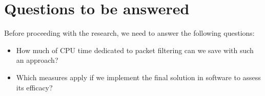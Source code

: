 \documentclass[conference]{IEEEtran}
\begin{document}
\section{Questions to be answered}
Before proceeding with the research, we need to answer the following questions:
\begin{itemize}
    \item How much of CPU time dedicated to packet filtering can we save with such an approach?
    \item Which measures apply if we implement the final solution in software to assess its efficacy?
\end{itemize}



\end{document}
